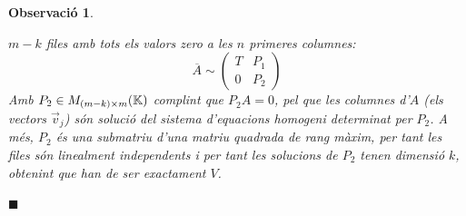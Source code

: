 \documentclass[
  11pt,
]{book}
\numberwithin{dummy}{section}
\theoremstyle{maincolornumbox}
\newtheorem{remarkT}{Observació}[chapter]
\theoremstyle{blacknumex}
\theoremstyle{blacknumbox}
\theoremstyle{maincolornum}
\newenvironment{remark}{\begin{remarkT}}{\hfill{\tiny\ensuremath{\blacksquare}}\end{remarkT}}
\begin{document}
\begin{remark}
\begin{itemize}
  \(m-k\) files amb tots els valors zero a les \(n\) primeres columnes:
  \[\overline A \sim
      \left(
      \begin{array}{c|c}
      T & P_1 \\ \hline
      0 & P_2
      \end{array}
      \right)\] Amb \(P_2\in M_{(m-k)\times m}(\mathbb{K})\) complint que
  \(P_2 A=0\), pel que les columnes d'\(A\) (els vectors \(\vec v_j\)) són
  solució del sistema d'equacions homogeni determinat per \(P_2\). A
  més, \(P_2\) és una submatriu d'una matriu quadrada de rang màxim, per
  tant les files són linealment independents i per tant les solucions
  de \(P_2\) tenen dimensió \(k\), obtenint que han de ser exactament \(V\).
\end{itemize}

\end{remark}
\end{document}
